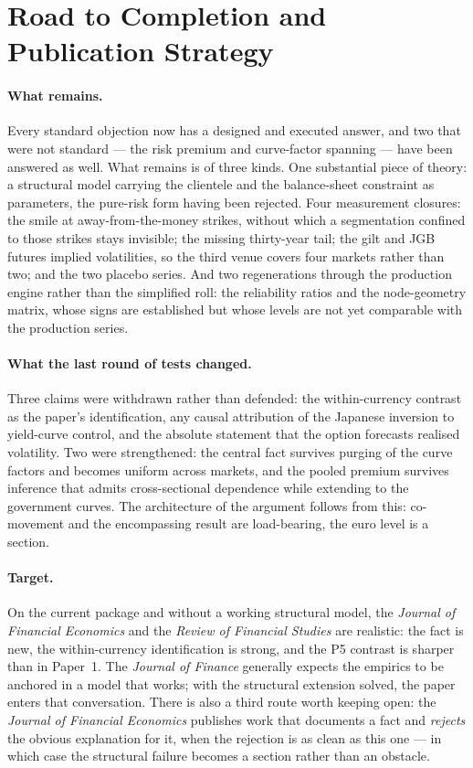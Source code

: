 \documentclass[11pt]{article}
\begin{document}
\section{Road to Completion and Publication Strategy}\label{sec:road}

\paragraph{What remains.} Every standard objection now has a designed and executed answer, and two
that were not standard --- the risk premium and curve-factor spanning --- have been answered as well.
What remains is of three kinds. One substantial piece of theory: a structural model carrying the
clientele and the balance-sheet constraint as parameters, the pure-risk form having been rejected.
Four measurement closures: the smile at away-from-the-money strikes, without which a segmentation
confined to those strikes stays invisible; the missing thirty-year tail; the gilt and JGB futures
implied volatilities, so the third venue covers four markets rather than two; and the two placebo
series. And two regenerations through the production engine rather than the simplified roll: the
reliability ratios and the node-geometry matrix, whose signs are established but whose levels are not
yet comparable with the production series.

\paragraph{What the last round of tests changed.} Three claims were withdrawn rather than defended:
the within-currency contrast as the paper's identification, any causal attribution of the Japanese
inversion to yield-curve control, and the absolute statement that the option forecasts realised
volatility. Two were strengthened: the central fact survives purging of the curve factors and becomes
uniform across markets, and the pooled premium survives inference that admits cross-sectional
dependence while extending to the government curves. The architecture of the argument follows from
this: co-movement and the encompassing result are load-bearing, the euro level is a section.

\paragraph{Target.} On the current package and without a working structural model, the \emph{Journal of
Financial Economics} and the \emph{Review of Financial Studies} are realistic: the fact is new, the
within-currency identification is strong, and the P5 contrast is sharper than in Paper~1. The
\emph{Journal of Finance} generally expects the empirics to be anchored in a model that works; with the
structural extension solved, the paper enters that conversation. There is also a third route worth
keeping open: the \emph{Journal of Financial Economics} publishes work that documents a fact and
\emph{rejects} the obvious explanation for it, when the rejection is as clean as this one --- in which
case the structural failure becomes a section rather than an obstacle.
\end{document}
